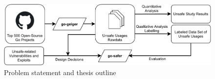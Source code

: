 \begin{figure}[htp!]
    \includegraphics[width=\textwidth]{assets/figures/chapter1/outline1.pdf}
    \caption{Problem statement and thesis outline}
    \label{fig:outline1}
\end{figure}
